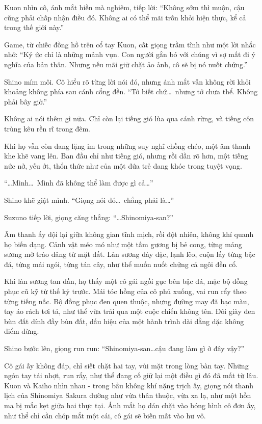 \documentclass[../main.tex]{subfiles}
\begin{document}
Kuon nhìn cô, ánh mắt hiền mà nghiêm, tiếp lời: ``Không sớm thì muộn, cậu cũng phải chấp nhận điều đó. Không ai có thể mãi trốn khỏi hiện thực, kể cả trong thế giới này.''

Game, từ chiếc đồng hồ trên cổ tay Kuon, cất giọng trầm tĩnh như một lời nhắc nhở: ``Ký ức chỉ là những mảnh vụn. Con người gắn bó với chúng vì sợ mất đi ý nghĩa của bản thân. Nhưng nếu mãi giữ chặt ảo ảnh, cô sẽ bị nó nuốt chửng.''

Shino mím môi. Cô hiểu rõ từng lời nói đó, nhưng ánh mắt vẫn không rời khỏi khoảng không phía sau cánh cổng đền. ``Tớ biết chứ\dots\ nhưng tớ chưa thể. Không phải bây giờ.''

Không ai nói thêm gì nữa. Chỉ còn lại tiếng gió lùa qua cánh rừng, và tiếng côn trùng kêu rền rĩ trong đêm.

Khi họ vẫn còn đang lặng im trong những suy nghĩ chồng chéo, một âm thanh khe khẽ vang lên. Ban đầu chỉ như tiếng gió, nhưng rồi dần rõ hơn, một tiếng nức nở, yếu ớt, thổn thức như của một đứa trẻ đang khóc trong tuyệt vọng.

``\dots Mình\dots\ Mình đã không thể làm được gì cả\dots''

Shino khẽ giật mình. ``Giọng nói đó\dots\ chẳng phải là\dots''

Suzuno tiếp lời, giọng căng thẳng: ``\dots Shinomiya-san?''

Âm thanh ấy dội lại giữa không gian tĩnh mịch, rồi đột nhiên, không khí quanh họ biến dạng. Cảnh vật méo mó như một tấm gương bị bẻ cong, từng mảng sương mờ trào dâng từ mặt đất. Làn sương dày đặc, lạnh lẽo, cuộn lấy từng bậc đá, từng mái ngói, từng tán cây, như thể muốn nuốt chửng cả ngôi đền cổ.

Khi làn sương tan dần, họ thấy một cô gái ngồi gục bên bậc đá, mặc bộ đồng phục cũ kỹ từ thế kỷ trước. Mái tóc hồng của cô phủ xuống, vai run rẩy theo từng tiếng nấc. Bộ đồng phục đen quen thuộc, nhưng đường may đã bạc màu, tay áo rách tơi tả, như thể vừa trải qua một cuộc chiến không tên. Đôi giày đen bùn đất dính đầy bùn đất, dấu hiệu của một hành trình dài dằng dặc không điểm dừng.


Shino bước lên, giọng run run: ``Shinomiya-san\dots cậu đang làm gì ở đây vậy?''

Cô gái ấy không đáp, chỉ siết chặt hai tay, vùi mặt trong lòng bàn tay. Những ngón tay tái nhợt, run rẩy, như thể đang cố giữ lại một điều gì đó đã mất từ lâu. Kuon và Kaiho nhìn nhau - trong bầu không khí nặng trịch ấy, giọng nói thanh lịch của Shinomiya Sakura dường như vừa thân thuộc, vừa xa lạ, như một hồn ma bị mắc kẹt giữa hai thực tại. Ánh mắt họ dán chặt vào bóng hình cô đơn ấy, như thể chỉ cần chớp mắt một cái, cô gái sẽ biến mất vào hư vô.
\end{document}
